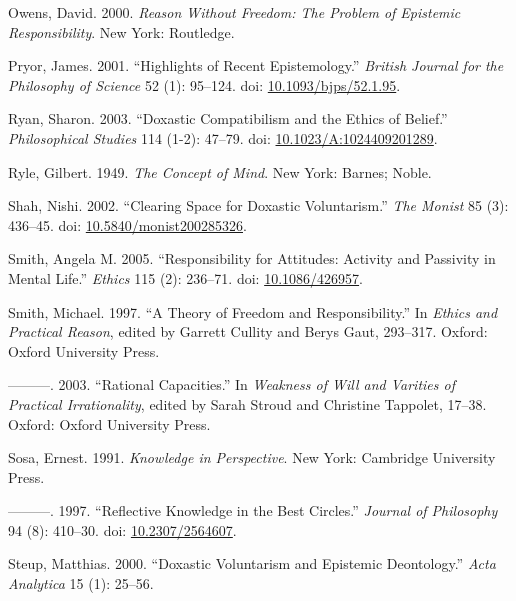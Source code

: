 \documentclass[
  11pt,
  letterpaper,
  DIV=11,
  numbers=noendperiod,
  twoside]{scrartcl}
\newlength{\cslhangindent}
\newenvironment{CSLReferences}[2] %
 {\begin{list}{}{%
  \setlength{\itemindent}{0pt}
  \setlength{\leftmargin}{0pt}
  \setlength{\parsep}{0pt}
  \ifodd #1
   \setlength{\leftmargin}{\cslhangindent}
   \setlength{\itemindent}{-1\cslhangindent}
  \fi
  \setlength{\itemsep}{#2\baselineskip}}}
 {\end{list}}
\begin{document}
\begin{CSLReferences}{1}{0}
Owens, David. 2000. \emph{Reason Without Freedom: The Problem of
Epistemic Responsibility}. New York: Routledge.

Pryor, James. 2001. {``Highlights of Recent Epistemology.''}
\emph{British Journal for the Philosophy of Science} 52 (1): 95--124.
doi: \href{https://doi.org/10.1093/bjps/52.1.95}{10.1093/bjps/52.1.95}.

Ryan, Sharon. 2003. {``Doxastic Compatibilism and the Ethics of
Belief.''} \emph{Philosophical Studies} 114 (1-2): 47--79. doi:
\href{https://doi.org/10.1023/A:1024409201289}{10.1023/A:1024409201289}.

Ryle, Gilbert. 1949. \emph{The Concept of Mind}. New York: Barnes;
Noble.

Shah, Nishi. 2002. {``Clearing Space for Doxastic Voluntarism.''}
\emph{The Monist} 85 (3): 436--45. doi:
\href{https://doi.org/10.5840/monist200285326}{10.5840/monist200285326}.

Smith, Angela M. 2005. {``Responsibility for Attitudes: Activity and
Passivity in Mental Life.''} \emph{Ethics} 115 (2): 236--71. doi:
\href{https://doi.org/10.1086/426957}{10.1086/426957}.

Smith, Michael. 1997. {``A Theory of Freedom and Responsibility.''} In
\emph{Ethics and Practical Reason}, edited by Garrett Cullity and Berys
Gaut, 293--317. Oxford: Oxford University Press.

---------. 2003. {``Rational Capacities.''} In \emph{Weakness of Will
and Varities of Practical Irrationality}, edited by Sarah Stroud and
Christine Tappolet, 17--38. Oxford: Oxford University Press.

Sosa, Ernest. 1991. \emph{Knowledge in Perspective}. New York: Cambridge
University Press.

---------. 1997. {``Reflective Knowledge in the Best Circles.''}
\emph{Journal of Philosophy} 94 (8): 410--30. doi:
\href{https://doi.org/10.2307/2564607}{10.2307/2564607}.

Steup, Matthias. 2000. {``Doxastic Voluntarism and Epistemic
Deontology.''} \emph{Acta Analytica} 15 (1): 25--56.


\end{CSLReferences}
\end{document}
